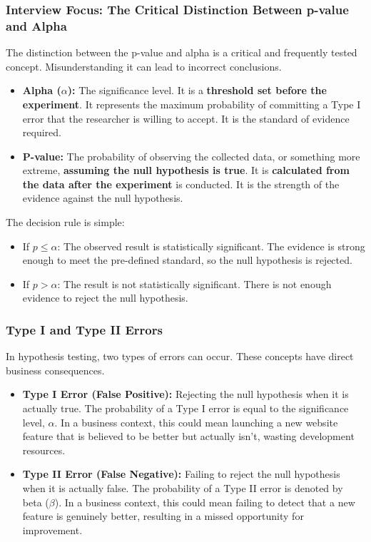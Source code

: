 \documentclass[11pt,a4paper]{article}
\begin{document}
\subsubsection{Interview Focus: The Critical Distinction Between p-value and Alpha}

The distinction between the p-value and alpha is a critical and frequently tested concept. Misunderstanding it can lead to incorrect conclusions.
\begin{itemize}
    \item \textbf{Alpha ($\alpha$):} The significance level. It is a \textbf{threshold set before the experiment}. It represents the maximum probability of committing a Type I error that the researcher is willing to accept. It is the standard of evidence required.
    \item \textbf{P-value:} The probability of observing the collected data, or something more extreme, \textbf{assuming the null hypothesis is true}. It is \textbf{calculated from the data after the experiment} is conducted. It is the strength of the evidence against the null hypothesis.
\end{itemize}

The decision rule is simple:
\begin{itemize}
    \item If $p \le \alpha$: The observed result is statistically significant. The evidence is strong enough to meet the pre-defined standard, so the null hypothesis is rejected.
    \item If $p > \alpha$: The result is not statistically significant. There is not enough evidence to reject the null hypothesis.
\end{itemize}

\subsubsection{Type I and Type II Errors}

In hypothesis testing, two types of errors can occur. These concepts have direct business consequences.
\begin{itemize}
    \item \textbf{Type I Error (False Positive):} Rejecting the null hypothesis when it is actually true. The probability of a Type I error is equal to the significance level, $\alpha$. In a business context, this could mean launching a new website feature that is believed to be better but actually isn't, wasting development resources.
    \item \textbf{Type II Error (False Negative):} Failing to reject the null hypothesis when it is actually false. The probability of a Type II error is denoted by beta ($\beta$). In a business context, this could mean failing to detect that a new feature is genuinely better, resulting in a missed opportunity for improvement.
\end{itemize}
\end{document}
